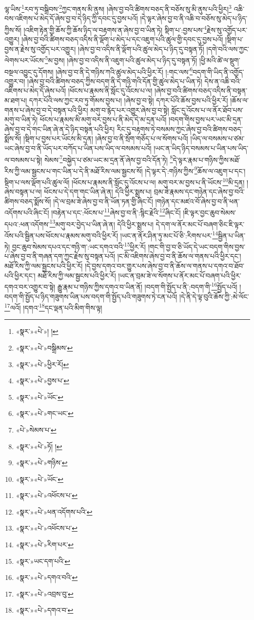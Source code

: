 ལྷ་ཡིས་\footnote{«སྣར་»«པེ་»། །}རབ་ཏུ་བསྒྲིབས་\footnote{«སྣར་»«པེ་»བསྒྲིམས་}ཀྱང་གནས་མི་ནུས། །ཞེས་བྱ་བའི་ཚིགས་བཅད་ནི་བཅོས་སུ་མི་ནུས་པའི་ཕྱིར།\footnote{«སྣར་»«པེ་»ཕྱིར་རོ།} འཆི་བས་འཇིགས་པ་མེད་དོ་ཞེས་བྱ་བ་དེ་ཉིད་ཀྱི་དབང་དུ་བྱས་པའོ། །དེ་ལྟར་ཞེས་བྱ་བ་ནི་འཆི་བ་བཅོས་སུ་མེད་པ་ཉིད་ཀྱིས་སོ། །འཇིག་རྟེན་གྱི་ཆོས་ཀྱི་ཆོས་ཉིད་ལ་བརྟགས་ན་ཞེས་བྱ་བ་ཡིན་ཏེ། སྡིག་པ་:བྱས་པས་\footnote{«སྣར་»«པེ་»བྱས་པ་}རྗེས་སུ་འགྱོད་པར་འགྱུར། །ཞེས་བྱ་བའི་ཚིགས་བཅད་འདིས་ནི་ལྡོག་པ་མེད་པ་དང་འཇུག་པའི་ཚུལ་གྱི་དབང་དུ་བྱས་པའོ། །སྡིག་པ་བྱས་ན་རྗེས་སུ་འགྱོད་པར་འགྱུར། །ཞེས་བྱ་བ་འདིས་ནི་ལྡོག་པའི་ཚུལ་མེད་པ་ཉིད་དུ་བསྟན་ཏོ། །དགེ་བའི་ལས་ཀྱང་ལེགས་པར་ཡོངས་\footnote{«སྣར་»«པེ་»ཡོང་}མ་བྱས། །ཞེས་བྱ་བ་འདིས་ནི་འཇུག་པའི་ཚུལ་མེད་པ་ཉིད་དུ་བསྟན་ཏོ། །ཕྱི་མའི་ཚེ་ལ་སྡུག་བསྔལ་འབྱུང་དུ་དོགས། །ཞེས་བྱ་བ་ནི་དེ་གཉིས་ཀའི་ཚུལ་མེད་པའི་ཕྱིར་རོ། །:གང་ལས་\footnote{«སྣར་»«པེ་»གང་ཡང་}བདག་གི་ཡིད་ནི་འགྱོད་འགྱུར་བ། །ཞེས་བྱ་བའི་ཚིགས་བཅད་ཀྱིས་བདག་ནི་དེ་གཉི་གའི་དོན་གྱི་ཚུལ་མེད་པ་ཡིན་ཏེ། དེས་ན་འཆི་བའི་འཇིགས་པ་མེད་དོ་ཞེས་པའོ། །ཕོངས་པ་རྣམས་ནི་སློང་དུ་འོངས་པ་ལ། །ཞེས་བྱ་བའི་ཚིགས་བཅད་འདིས་ནི་བསྟན་མ་ཐག་པ། དཀར་པོའི་ལས་ཀྱང་རབ་ཏུ་གོམས་བྱས་པ། །ཞེས་བྱ་བ་སྟེ། དཀར་པོའི་ཆོས་བྱས་པའི་ཕྱིར་རོ། །ཆོས་ལ་གནས་པ་ཞེས་བྱ་བ་དེ་བསྟན་པའི་ཕྱིར། མགུ་བ་རྙེད་པར་འགྱུར་ཞེས་བྱ་བ་སྟེ། སློང་དུ་འོངས་པ་ལ་ནོར་ཐོབ་པས་མགུ་བ་ཡིན་ཏེ། ཕོངས་པ་རྣམས་མི་མགུ་བར་བྱས་པ་ནི་མེད་དེ་མ་དྲན་པའོ། །བདག་གིས་བྱས་པར་ཡང་མི་དྲན་ཞེས་བྱ་བ་དེ་གང་ཡིན་ཞེ་ན་དེ་ཉིད་བསྟན་པའི་ཕྱིར། རིང་དུ་བརྟགས་ཏེ་བསམས་ཀྱང་ཞེས་བྱ་བའི་ཚིགས་བཅད་སྨོས་སོ། །སྡིག་པ་བྱས་པར་ཡོངས་མི་དྲན། །ཞེས་བྱ་བ་ནི་སྲོག་གཅོད་པ་ལ་སོགས་པའོ། །ཡིད་ལ་བསམས་པ་ཙམ་ཡང་ཞེས་བྱ་བ་ནི་ཡོད་པར་བཀོད་པ་ཡིན་པས་ཡིད་ལ་བསམས་པའོ། །ཡང་ན་ཡིད་ཉིད་བསམས་པ་ཡིན་པས་ཡིད་ལ་བསམས་པ་སྟེ། སེམས་\footnote{«པེ་»སེམས་པ་}བསྐྱེད་པ་ཙམ་ཡང་མ་དྲན་ནོ་ཞེས་བྱ་བའི་དོན་ཏེ། \footnote{«སྣར་»«པེ་»ཏོ། ། }དེ་ལྟར་རྣམ་པ་གཉིས་ཀྱིས་མཐོ་རིས་ཀྱི་ལམ་སྦྱངས་པ་གང་ཡིན་པ་དེ་ནི་མཐོ་རིས་ལམ་སྦྱངས་སོ། །དེ་ལྟར་དེ་:གཉིས་ཀྱིས་\footnote{«སྣར་»«པེ་»གཉིས་}ཆོས་ལ་འཇུག་པ་དང་། སྡིག་པ་ལས་ལྡོག་པའི་ཚུལ་ལོ། །ཕོངས་པ་རྣམས་ནི་སློང་དུ་འོངས་པ་ལ། མགུ་བར་མ་བྱས་པ་ནི་ཡོངས་\footnote{«སྣར་»«པེ་»ཡོང་}མི་དྲན། །ཞེས་བསྟན་པ་ལ། ཕོངས་པ་དེ་དག་གང་ཡིན་ཞེ་ན། དེའི་ཕྱིར་སྨྲས་པ། བྲམ་ཟེ་རྣམས་དང་གཉེན་དང་ཞེས་བྱ་བའི་ཚིགས་བཅད་སྨོས་སོ། །དེ་ལ་བྲམ་ཟེ་ཞེས་བྱ་བ་ནི་ཡོན་ཏན་གྱི་ཞིང་ངོ། །གཉེན་དང་མཛའ་བོ་ཞེས་བྱ་བ་ནི་ཕན་འདོགས་པའི་ཞིང་ངོ། །བརྟེན་པ་དང་:ཕོངས་པ་\footnote{«སྣར་»«པེ་»འཕོངས་པ་}ཞེས་བྱ་བ་ནི་:སྙིང་རྗེའི་\footnote{«སྣར་»«པེ་»ཕན་འདོགས་པའི་}ཞིང་ངོ། །ཇི་ལྟར་བྱང་ཆུབ་སེམས་དཔའ་:ཕན་འདོགས་\footnote{«སྣར་»«པེ་»འཕོངས་པ་}མགུ་བར་བྱེད་པ་ཡིན་ཞེ་ན། དེའི་ཕྱིར་སྨྲས་པ། དེ་དག་ལ་ནོར་མང་པོ་བཞག་ཅིང་ཇི་ལྟར་འོས་པའི་སྦྱིན་པས་ཕོངས་པ་རྣམས་མགུ་བའི་ཕྱིར་རོ། །ཡང་ན་ནོར་ཤིན་ཏུ་མང་པོ་ཅི་:རིགས་པར་\footnote{«སྣར་»«པེ་»རིག་པར་}སྦྱིན་པ་ཡིན་ཏེ། བྱང་ཆུབ་སེམས་དཔའ་དང་གཉི་ག་:ཡང་དགའ་བའི་\footnote{«སྣར་»ཡང་དག་པའི་}ཕྱིར་རོ། །གང་གི་བྱ་བ་ཅི་ཡོད་དེ་ཡང་བདག་གིས་བྱས་པ་ཞེས་བྱ་བ་ནི་གཞན་དག་ཀྱང་རྗེས་སུ་བསྟན་པའོ། །ང་མི་འཇིགས་ཞེས་བྱ་བ་ནི་ཆོས་ལ་གནས་པའི་ཕྱིར་དང་། མཐོ་རིས་ཀྱི་ལམ་སྦྱངས་པའི་ཕྱིར་རོ། །དེ་བྱས་དགའ་བར་གྱུར་པས་ཞེས་བྱ་བ་ནི་ཆོས་ལ་གནས་པ་དགའ་བ་ཐོབ་པའི་ཕྱིར་དང་། མཐོ་རིས་ཀྱི་ལམ་སྦྱངས་པའི་ཕྱིར་རོ། །ཡང་ན་བྲམ་ཟེ་ལ་སོགས་པ་ནོར་མང་པོ་བཞག་པའི་ཕྱིར་དགའ་བར་འགྱུར་བ་སྟེ། རྒྱུ་རྣམ་པ་གཉིས་ཀྱིས་དགའ་བ་ཡིན་ནོ། །བདག་གི་སྤྱོད་པ་ནི་:བདག་གི་\footnote{«སྣར་»«པེ་»དགའ་བའི་}སྤྱོད་པའོ། །བདག་གི་སྤྱོད་པ་ཉིད་གཟུགས་ཡིན་པས་བདག་གི་སྤྱོད་པའི་གཟུགས་ཏེ་ངན་པའོ། །དེ་ནི་དེ་ལྟ་བུའི་ཆོས་ཀྱི་:མེ་ལོང་\footnote{«སྣར་»«པེ་»འབྲས་བུ་}ལའོ། །དགའ་\footnote{«སྣར་»«པེ་»དགའ་བ་}དང་ལྡན་པའི་མིག་གིས་ལྟ། 